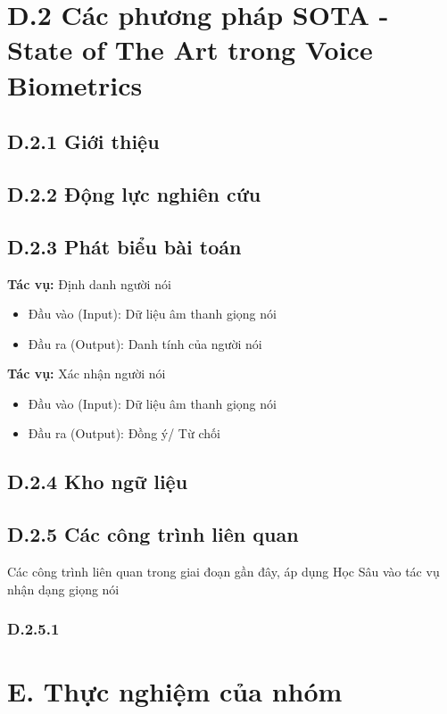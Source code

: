 \documentclass{article}
\begin{document}
	\section{D.2 Các phương pháp SOTA - State of The Art trong Voice Biometrics}
	\subsection{D.2.1 Giới thiệu}
	
	\subsection{D.2.2 Động lực nghiên cứu}
	
	\subsection{D.2.3 Phát biểu bài toán}
	\textbf{Tác vụ:} Định danh người nói
	\begin{itemize}
		\item Đầu vào (Input): Dữ liệu âm thanh giọng nói
		\item Đầu ra (Output): Danh tính của người nói
	\end{itemize}
	\textbf{Tác vụ:} Xác nhận người nói
	\begin{itemize}
		\item Đầu vào (Input): Dữ liệu âm thanh giọng nói
		\item Đầu ra (Output): Đồng ý/ Từ chối
	\end{itemize}

	\subsection{D.2.4 Kho ngữ liệu}
	
	\subsection{D.2.5 Các công trình liên quan}
	Các công trình liên quan trong giai đoạn gần đây, áp dụng Học Sâu vào tác vụ nhận dạng giọng nói
	
	\subsubsection{D.2.5.1 }


	\section{E. Thực nghiệm của nhóm}
	
	\nocite{*}
	\newpage\cleardoublepage
	
	
\end{document}
